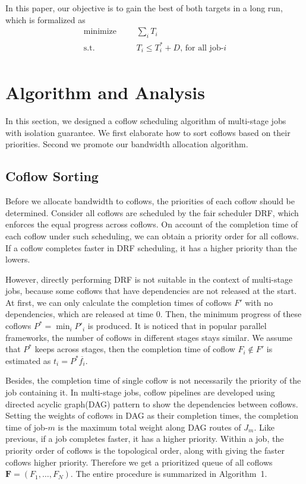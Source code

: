 \documentclass[10pt, conference, letterpaper]{IEEEtran}
\begin{document}
In this paper, our objective is to gain the best of both targets in a long run, which is formalized as
\begin{equation}
	\begin{aligned}
		\text{minimize} & & &\sum\limits_{i}T_i\\
		\text{s.t.} & & &T_i \leq T_i^* + D \text{, for all job-}i\\
	\end{aligned}
\end{equation}

\section{Algorithm and Analysis}
In this section, we designed a coflow scheduling algorithm of multi-stage jobs with isolation guarantee. We first elaborate how to sort coflows based on their priorities. Second we promote our bandwidth allocation algorithm.

\subsection{Coflow Sorting}
Before we allocate bandwidth to coflows, the priorities of each coflow should be determined. Consider all coflows are scheduled by the fair scheduler DRF, which enforces the equal progress across coflows\cite{DRF,HUG}. On account of the completion time of each coflow under such scheduling, we can obtain a priority order for all coflows. If a coflow completes faster in DRF scheduling, it has a higher priority than the lowers.

However, directly performing DRF is not suitable in the context of multi-stage jobs, because some coflows that have dependencies are not released at the start. At first, we can only calculate the completion times of coflows $F'$ with no dependencies, which are released at time 0. Then, the minimum progress of these coflows $P^* = \min_iP'_i$ is produced. It is noticed that in popular parallel frameworks, the number of coflows in different stages stays similar\cite{Spark,coflowsurvey}. We assume that $P^*$ keeps across stages, then the completion time of coflow $F_i \notin F'$ is estimated as $t_i = P^*\overline{f_i}$.

Besides, the completion time of single coflow is not necessarily the priority of the job containing it. In multi-stage jobs, coflow pipelines are developed using directed acyclic graph(DAG) pattern to show the dependencies between coflows. Setting the weights of coflows in DAG as their completion times, the completion time of job-$m$ is the maximum total weight along DAG routes of $J_m$. Like previous, if a job completes faster, it has a higher priority. Within a job, the priority order of coflows is the topological order, along with giving the faster coflows higher priority. Therefore we get a prioritized queue of all coflows $\mathbf{F} = (F_1,\dots,F_N)$. The entire procedure is summarized in Algorithm~1.
\end{document}
